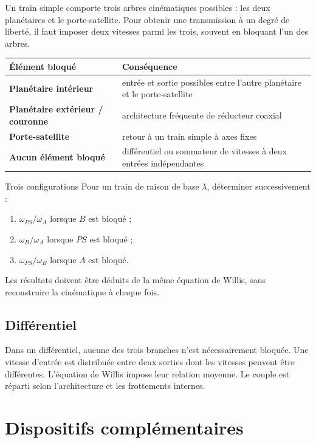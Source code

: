 Un train simple comporte trois arbres cinématiques possibles : les deux
planétaires et le porte-satellite. Pour obtenir une transmission à un
degré de liberté, il faut imposer deux vitesses parmi les trois, souvent
en bloquant l'un des arbres.

\begin{center}
\small
\begin{tabularx}{\linewidth}{>{\bfseries}p{3.6cm}X}
\toprule
Élément bloqué & Conséquence \\
\midrule
Planétaire intérieur & entrée et sortie possibles entre l'autre planétaire et le porte-satellite \\
Planétaire extérieur / couronne & architecture fréquente de réducteur coaxial \\
Porte-satellite & retour à un train simple à axes fixes \\
Aucun élément bloqué & différentiel ou sommateur de vitesses à deux entrées indépendantes \\
\bottomrule
\end{tabularx}
\end{center}

\begin{TLThreeApp}{Trois configurations}
Pour un train de raison de base $\lambda$, déterminer successivement :
\begin{enumerate}
  \item $\omega_{PS}/\omega_A$ lorsque $B$ est bloqué ;
  \item $\omega_B/\omega_A$ lorsque $PS$ est bloqué ;
  \item $\omega_{PS}/\omega_B$ lorsque $A$ est bloqué.
\end{enumerate}
Les résultats doivent être déduits de la même équation de Willis, sans
reconstruire la cinématique à chaque fois.
\end{TLThreeApp}

\subsection{Différentiel}

Dans un différentiel, aucune des trois branches n'est nécessairement
bloquée. Une vitesse d'entrée est distribuée entre deux sorties dont les
vitesses peuvent être différentes. L'équation de Willis impose leur
relation moyenne. Le couple est réparti selon l'architecture et les
frottements internes.

\section{Dispositifs complémentaires}
\label{sec:trans-complementaires}

